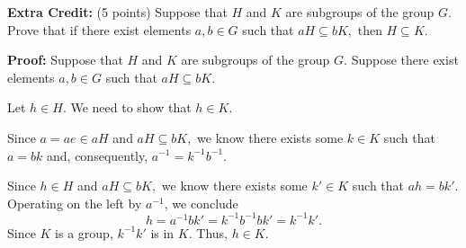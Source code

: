 \documentclass[12pt]{article}
\renewcommand{\emph}[1]{\textsf{\textbf{#1}}}
\begin{document}
\emph{Extra Credit:} (5 points) Suppose that $H$ and $K$ are subgroups of the group $G.$ Prove that if there exist elements $a,b \in G$ such that $aH \subseteq bK,$ then $H \subseteq K.$

\textbf{Proof:} Suppose that $H$ and $K$ are subgroups of the group $G.$ Suppose there exist elements $a,b \in G$ such that $aH \subseteq bK.$

Let $h \in H.$ We need to show that $h \in K.$ 

Since $a=ae \in aH$ and $aH \subseteq bK,$ we know there exists some $k \in K$ such that $a=bk$ and, consequently, $a^{-1}=k^{-1}b^{-1}.$  

Since $h \in H$ and $aH \subseteq bK,$ we know there exists some $k' \in K$ such that $ah=bk'.$ Operating on the left by $a^{-1}$, we conclude $$h=a^{-1}bk'=k^{-1}b^{-1}bk'=k^{-1}k'.$$
 Since $K$ is a group, $k^{-1}k'$ is in $K.$ Thus, $h \in K.$
\end{document}
